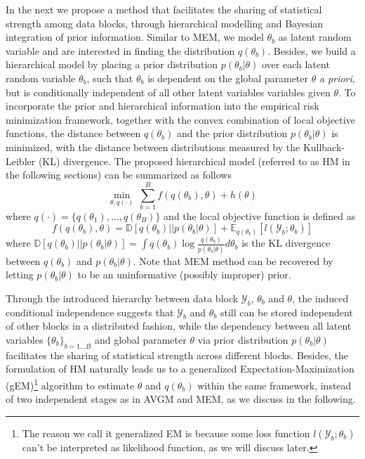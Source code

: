 \documentclass{article}
\newcommand{\1}[0]{\ensuremath{\boldsymbol{1}}\xspace}
\begin{document}
In the next we propose a method that facilitates the sharing of statistical strength among data blocks, through hierarchical modelling and Bayesian integration of prior information. Similar to MEM, we model $\theta_b$ as latent random variable and are interested in finding the distribution $q(\theta_b)$. Besides, we build a hierarchical model by placing a prior distribution $p(\theta_b | \theta)$ over each latent random variable $\theta_b$, such that $\theta_b$ is dependent on the global parameter $\theta$ \emph{a priori}, but is conditionally independent of all other latent variables variables given $\theta$. To incorporate the prior and hierarchical information into the empirical risk minimization framework, together with the convex combination of local objective functions, the distance between $q(\theta_b)$ and the prior distribution $p(\theta_b|\theta)$ is minimized, with the distance between distributions measured by the Kullback-Leibler (KL) divergence. The proposed hierarchical model (referred to as HM in the following sections) can be summarized as follows
\begin{equation}\label{hm}
\textstyle \min_{\theta, q(\cdot)} ~ \sum_{b=1}^B f(q(\theta_b), \theta) + h(\theta)
\end{equation}
where $q(\cdot) = \{q(\theta_1), \ldots, q(\theta_B)\}$ and the local objective function is defined as
\begin{equation}\label{local_obj}
\textstyle f(q(\theta_b), \theta)  = \mathbb{D}[q(\theta_b)||p(\theta_b|\theta)] + \mathbb{E}_{q(\theta_b)}[l(\mathcal{Y}_b; \theta_b)]
\end{equation}
where $\mathbb{D}[q(\theta_b)||p(\theta_b|\theta)] = \int q(\theta_b)\log\frac{q(\theta_b)}{p(\theta_b|\theta)}d\theta_b$ is the KL divergence between $q(\theta_b)$ and $p(\theta_b|\theta)$. Note that MEM method can be recovered by letting $p(\theta_b|\theta)$ to be an uninformative (possibly improper) prior. 

Through the introduced hierarchy between data block $\mathcal{Y}_b$, $\theta_b$ and $\theta$, the induced conditional independence suggests that $\mathcal{Y}_b$ and $\theta_b$ still can be stored independent of other blocks in a distributed fashion, while the dependency between all latent variables $\{\theta_b\}_{b=1\ldots B}$ and global parameter $\theta$ via prior distribution $p(\theta_b|\theta)$ facilitates the sharing of statistical strength across different blocks. Besides, the formulation of HM naturally leads us to a generalized Expectation-Maximization (gEM)\footnote{The reason we call it generalized EM is because some loss function $l(\mathcal{Y}_b; \theta_b)$ can't be interpreted as likelihood function, as we will discuss later.} algorithm to estimate $\theta$ and $q(\theta_b)$ within the same framework, instead of two independent stages as in AVGM and MEM, as we discuss in the following.
\end{document}
